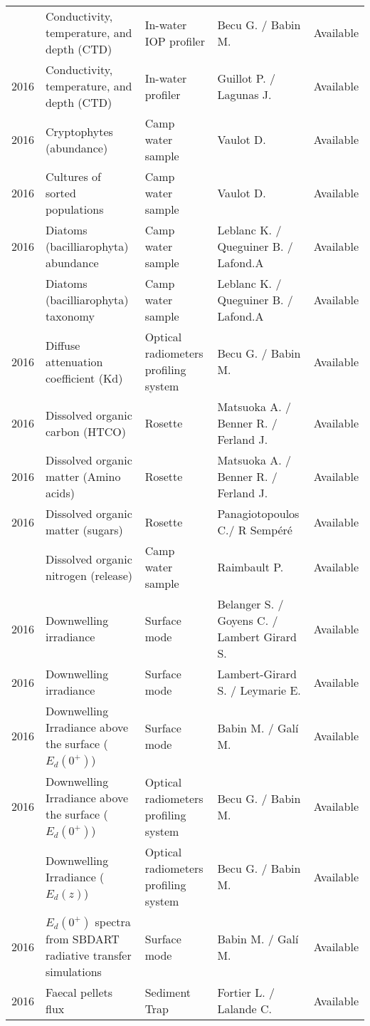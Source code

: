 \documentclass[]{article}
\begin{document}
\begin{landscape}
\begin{longtable}{rllll}
\addlinespace
2016 & Conductivity, temperature, and depth (CTD) & In-water IOP profiler & Becu G. / Babin M. & Available\\
2016 & Conductivity, temperature, and depth (CTD) & In-water profiler & Guillot P. / Lagunas J. & Available\\
2016 & Cryptophytes (abundance) & Camp water sample & Vaulot D. & Available\\
2016 & Cultures of sorted populations & Camp water sample & Vaulot D. & Available\\
2016 & Diatoms (bacilliarophyta) abundance & Camp water sample & Leblanc K. / Queguiner B. / Lafond.A & Available\\
\addlinespace
2016 & Diatoms (bacilliarophyta) taxonomy & Camp water sample & Leblanc K. / Queguiner B. / Lafond.A & Available\\
2016 & Diffuse attenuation coefficient (Kd) & Optical radiometers profiling system & Becu G. / Babin M. & Available\\
2016 & Dissolved organic carbon (HTCO) & Rosette & Matsuoka A. / Benner R. / Ferland J. & Available\\
2016 & Dissolved organic matter (Amino acids) & Rosette & Matsuoka A. / Benner R. / Ferland J. & Available\\
2016 & Dissolved organic matter (sugars) & Rosette & Panagiotopoulos C./ R Sempéré & Available\\
\addlinespace
2016 & Dissolved organic nitrogen (release) & Camp water sample & Raimbault P. & Available\\
2016 & Downwelling irradiance & Surface mode & Belanger S. / Goyens C. / Lambert Girard S. & Available\\
2016 & Downwelling irradiance & Surface mode & Lambert-Girard S. / Leymarie E. & Available\\
2016 & Downwelling Irradiance above the surface ($E_d(0^+)$) & Surface mode & Babin M. / Galí M. & Available\\
2016 & Downwelling Irradiance above the surface ($E_d(0^+)$) & Optical radiometers profiling system & Becu G. / Babin M. & Available\\
\addlinespace
2016 & Downwelling Irradiance ($E_d(z)$) & Optical radiometers profiling system & Becu G. / Babin M. & Available\\
2016 & $E_d(0^+)$ spectra from SBDART radiative transfer simulations & Surface mode & Babin M. / Galí M. & Available\\
2016 & Faecal pellets flux & Sediment Trap & Fortier L. / Lalande C. & Available\\

\end{longtable}
\end{landscape}
\end{document}
